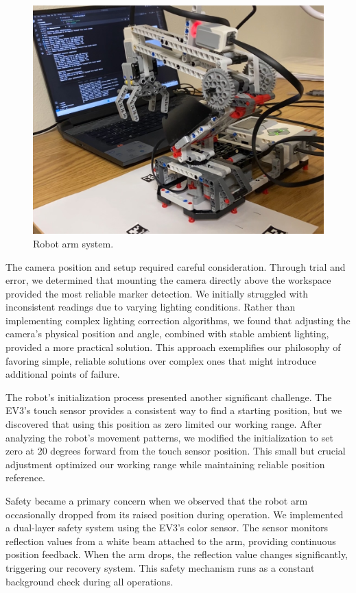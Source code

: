 \documentclass[10pt,twocolumn]{article}
\begin{document}
\begin{figure}
    \centering
    \includegraphics[width=.95\linewidth]{Robot.jpg}
    \caption{
        Robot arm system.
    }
    \label{fig:third-page}
\end{figure}

The camera position and setup required careful consideration. Through trial and error, we determined that mounting the camera directly above the workspace provided the most reliable marker detection. We initially struggled with inconsistent readings due to varying lighting conditions. Rather than implementing complex lighting correction algorithms, we found that adjusting the camera's physical position and angle, combined with stable ambient lighting, provided a more practical solution. This approach exemplifies our philosophy of favoring simple, reliable solutions over complex ones that might introduce additional points of failure.

The robot's initialization process presented another significant challenge. The EV3's touch sensor provides a consistent way to find a starting position, but we discovered that using this position as zero limited our working range. After analyzing the robot's movement patterns, we modified the initialization to set zero at 20 degrees forward from the touch sensor position. This small but crucial adjustment optimized our working range while maintaining reliable position reference.

Safety became a primary concern when we observed that the robot arm occasionally dropped from its raised position during operation. We implemented a dual-layer safety system using the EV3's color sensor. The sensor monitors reflection values from a white beam attached to the arm, providing continuous position feedback. When the arm drops, the reflection value changes significantly, triggering our recovery system. This safety mechanism runs as a constant background check during all operations.
\end{document}
